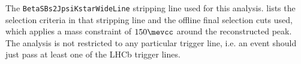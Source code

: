 The {\texttt{BetaSBs2JpsiKstarWideLine}} stripping line used for this analysis.  lists the 
selection criteria in that stripping line and the offline final selection cuts used, which applies a mass constraint of
$150\mevcc$ around the reconstructed \jpsi peak. The analysis is not restricted to any particular trigger line, i.e. an 
event should just pass at least one of the LHCb trigger lines.



\begin{table}[htb]
  \centerline{
    }
\end{table}
